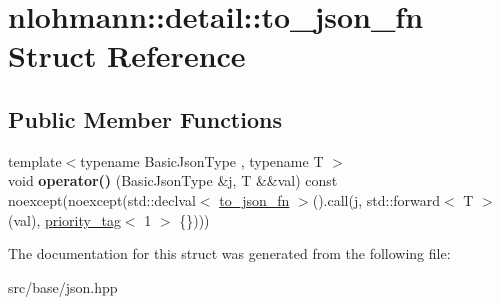 \hypertarget{structnlohmann_1_1detail_1_1to__json__fn}{}\section{nlohmann\+:\+:detail\+:\+:to\+\_\+json\+\_\+fn Struct Reference}
\label{structnlohmann_1_1detail_1_1to__json__fn}
\subsection*{Public Member Functions}
\begin{DoxyCompactItemize}
\item 
\mbox{\label{structnlohmann_1_1detail_1_1to__json__fn_ac63f82d3eed085522f1cbe99a521a4d4}} 
{\footnotesize template$<$typename Basic\+Json\+Type , typename T $>$ }\\void {\bfseries operator()} (Basic\+Json\+Type \&j, T \&\&val) const noexcept(noexcept(std\+::declval$<$ \mbox{\hyperlink{structnlohmann_1_1detail_1_1to__json__fn}{to\+\_\+json\+\_\+fn}} $>$().call(j, std\+::forward$<$ T $>$(val), \mbox{\hyperlink{structnlohmann_1_1detail_1_1priority__tag}{priority\+\_\+tag}}$<$ 1 $>$ \{\})))
\end{DoxyCompactItemize}


The documentation for this struct was generated from the following file\+:\begin{DoxyCompactItemize}
\item 
src/base/json.\+hpp\end{DoxyCompactItemize}
